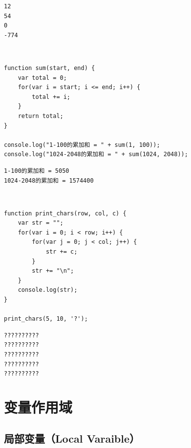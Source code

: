 \begin{tcolorbox}
	\begin{verbatim}
12
54
0
-774
	\end{verbatim}
\end{tcolorbox}

\vspace{0.5cm}

\\

\begin{lstlisting}[style=htmlcssjs]
function sum(start, end) {
    var total = 0;
    for(var i = start; i <= end; i++) {
        total += i;
    }
    return total;
}

console.log("1-100的累加和 = " + sum(1, 100));
console.log("1024-2048的累加和 = " + sum(1024, 2048));
\end{lstlisting}

\begin{tcolorbox}
	\begin{verbatim}
1-100的累加和 = 5050
1024-2048的累加和 = 1574400
	\end{verbatim}
\end{tcolorbox}

\vspace{0.5cm}

\\

\begin{lstlisting}[style=htmlcssjs]
function print_chars(row, col, c) {
    var str = "";
    for(var i = 0; i < row; i++) {
        for(var j = 0; j < col; j++) {
            str += c;
        }
        str += "\n";
    }
    console.log(str);
}

print_chars(5, 10, '?');
\end{lstlisting}

\begin{tcolorbox}
	\begin{verbatim}
??????????
??????????
??????????
??????????
??????????
	\end{verbatim}
\end{tcolorbox}

\newpage

\section{变量作用域}

\subsection{局部变量（Local Varaible）}

